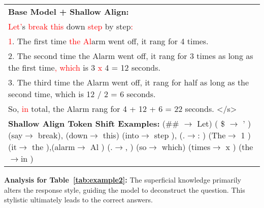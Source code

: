 \begin{table*}[htp]
\begin{center}
\begin{tabular}{|p{14cm}|}
\midrule
\textbf{Base Model + Shallow Align:}\\
\textcolor{red}{Let'}s \textcolor{red}{break} \textcolor{red}{this} down \textcolor{red}{step} by step\textcolor{red}{:}\\
\textcolor{red}{1}. The first time \textcolor{red}{the Al}arm went off, it rang for 4 times.\\
2. The second time the Alarm went off, it rang for 3 times as long as the first time\textcolor{red}{, which} is 3 \textcolor{red}{x} 4 = 12 seconds.\\
3. The third time the Alarm went off, it rang for half as long as the second time, which is 12 / 2 = 6 seconds.\\
So, \textcolor{red}{in} total, the Alarm rang for 4 + 12 + 6 = 22 seconds. </s>\\
\midrule
\textbf{Shallow Align Token Shift Examples:} (\#\# $\rightarrow$ Let)  ( \$ $\rightarrow$ ' )  (say$\rightarrow$ break), (down$\rightarrow$ this)  (into$\rightarrow$ step ), (.$\rightarrow$: ) (The$\rightarrow$ 1 ) (it$\rightarrow$ the ),(alarm$\rightarrow$ Al )  (.$\rightarrow$, )  (so$\rightarrow$ which)  (times$\rightarrow$ x )  (the$\rightarrow$in )  \\
\bottomrule
\end{tabular}

\end{center}
\caption{Examples of responses from the Base Model, Aligned Model, and Base Model with Superficial Knowledge (\textcolor{red}{Red} color shows the shift position).}
\label{tab:example2}
\end{table*}

\textbf{Analysis for Table~\ref{tab:example2}:} The superficial knowledge primarily alters the response style, guiding the model to deconstruct the question. This stylistic  ultimately leads to the correct answers.





\newpage


